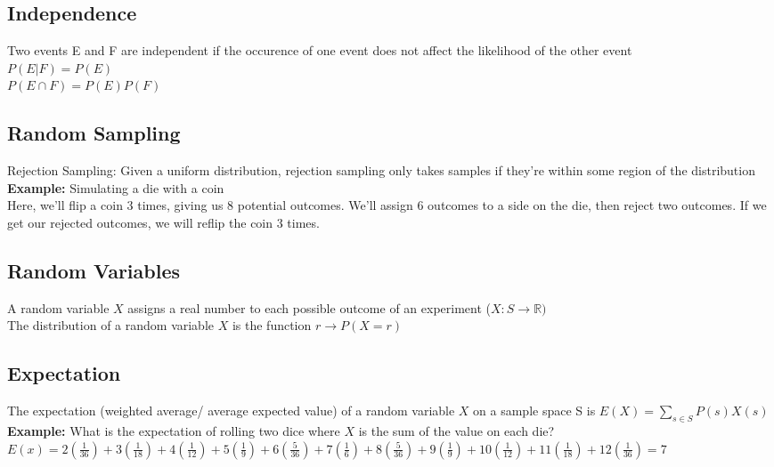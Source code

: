 \documentclass{article}
\begin{document}
\begin{spacing}{1.5}
\subsection{Independence}
\label{sec:independence}
Two events E and F are independent if the occurence of one event does not affect the likelihood of the other event\\
$P(E|F) = P(E)$\\
$P(E \cap F) = P(E)P(F)$
\subsection{Random Sampling}
Rejection Sampling: Given a uniform distribution, rejection sampling only takes samples if they're within some region of the distribution\\

\textbf{Example:} Simulating a die with a coin\\
Here, we'll flip a coin 3 times, giving us 8 potential outcomes. We'll assign 6 outcomes to a side on the die, then reject two outcomes. If we get our rejected outcomes, we will reflip the coin 3 times.\\
\label{sec:rsampling}
\subsection{Random Variables}
\label{sec:rvariables}
A random variable $X$ assigns a real number to each possible outcome of an experiment ($X: S \rightarrow \mathbb{R})$\\
The distribution of a random variable $X$ is the function $r \rightarrow P(X=r)$
\subsection{Expectation}
\label{sec:expectation}
The expectation (weighted average/ average expected value) of a random variable $X$ on a sample space S is $E(X) = \sum_{s \in S}P(s)X(s)$
\textbf{Example:} What is the expectation of rolling two dice where $X$ is the sum of the value on each die?\\
$E(x) = 2(\frac{1}{36}) + 3(\frac{1}{18}) + 4(\frac{1}{12}) + 5(\frac{1}{9}) + 6(\frac{5}{36}) + 7(\frac{1}{6}) + 8(\frac{5}{36}) + 9(\frac{1}{9}) + 10(\frac{1}{12}) + 11(\frac{1}{18}) + 12(\frac{1}{36}) = 7$
\newpage

\end{spacing}
\end{document}
